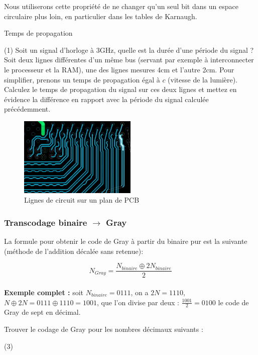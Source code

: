 \documentclass[a4paper,11pt]{book}
\theoremstyle{definition}
\begin{document}
Nous utiliserons cette propriété de ne changer qu'un seul bit dans un espace circulaire plus loin, en particulier dans les tables de Karnaugh.

\begin{exercise} Temps de propagation
    \begin{tasks}(1)
        \task Soit un signal d'horloge à 3GHz, quelle est la durée d'une période du signal ?
        \task Soit deux lignes différentes d'un même bus (servant par exemple à interconnecter le processeur et la RAM), une des lignes mesures 4cm et l'autre 2cm. Pour simplifier, prenons un temps de propagation égal à $c$ (vitesse de la lumière). Calculez le temps de propagation du signal sur ces deux lignes et mettez en évidence la différence en rapport avec la période du signal calculée précédemment.

    \end{tasks}
    \label{propagation}
\end{exercise}

        \begin{figure}[h]
            \centering
            \includegraphics[width=0.5\textwidth]{media/buslines.png}
            \caption{Lignes de circuit sur un plan de PCB}
            \label{codeGray}
        \end{figure}


\subsubsection{Transcodage binaire $\rightarrow$ Gray}
La formule pour obtenir le code de Gray à partir du binaire pur est la suivante (méthode de l'addition décalée sans retenue):

\[N_{Gray} = \frac{N_{binaire}\oplus2N_{binaire}}{2}\]
\\
\textbf{Exemple complet :} soit $N_{binaire} = 0111$, on a $2N = 1110$, $N\oplus2N = 0111 \oplus 1110 = 1001$, que l'on divise par deux : $\frac{1001}{2}= 0100$ le code de Gray de sept en décimal.

\begin{exercise}
    Trouver le codage de Gray pour les nombres décimaux suivants :
    \begin{tasks}(3)
    \end{tasks}
\end{exercise}
\end{document}
